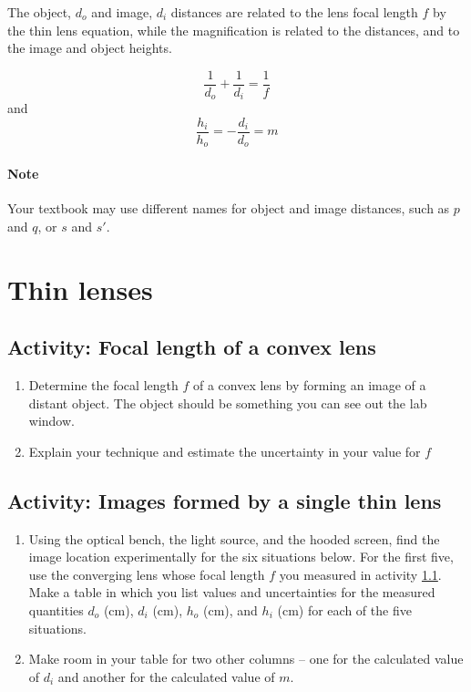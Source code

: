 \begin{multicols}{2}
The object, $d_o$ and image, $d_i$ distances are related to the lens focal length $f$ by the thin lens equation, while the magnification is related to the distances, and to the image and object heights.

\begin{equation} \label{e:thin}
	\frac{1}{d_o} + \frac{1}{d_i} = \frac{1}{f}
\end{equation}
and
\begin{equation} \label{e:thinmag}
	\frac{h_i}{h_o} = -\frac{d_i}{d_o} = m
\end{equation}

\paragraph{Note} Your textbook may use different names for object and image distances, such as $p$ and $q$, or $s$ and $s'$.

\section {Thin lenses}
\subsection{Activity: Focal length of a convex lens}\label{s:focal}
\begin{enumerate}
	\item Determine the focal length $f$ of a convex lens by forming an image of a distant object.  The object should be something you can see out the lab window.
	\item Explain your technique and estimate the uncertainty in your value for $f$
\end{enumerate}

\subsection{Activity: Images formed by a single thin lens}\label{s:thinlens}
\begin{enumerate} 
	\item Using the optical bench, the light source, and the hooded screen, find the image location experimentally for the six situations below. For the first five, use the converging lens whose focal length $f$ you measured in activity \ref{s:focal}. Make a table in which you list values and uncertainties for the measured quantities $d_o$ (cm), $d_i$ (cm), $h_o$ (cm), and $h_i$ (cm) for each of the five situations.
	\item Make room in your table for two other columns -- one for the calculated value of $d_i$ and another for the calculated value of $m$.
\end{enumerate}
	

\end{multicols}

